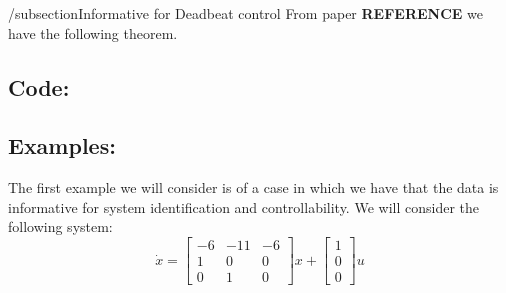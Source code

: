 
/subsection{Informative for Deadbeat control}
From paper \textbf{REFERENCE} we have the following theorem.

\subsection{Code:}


\subsection{Examples:}
The first example we will consider is of a case in which we have that the data is informative for system identification and controllability. We will consider the following system:
\[ \dot x = \begin{bmatrix} 
-6& -11& -6 \\
 1&   0&  0 \\
 0&   1&  0 
\end{bmatrix} x + \begin{bmatrix} 1 \\ 0 \\ 0 \end{bmatrix} u \]

